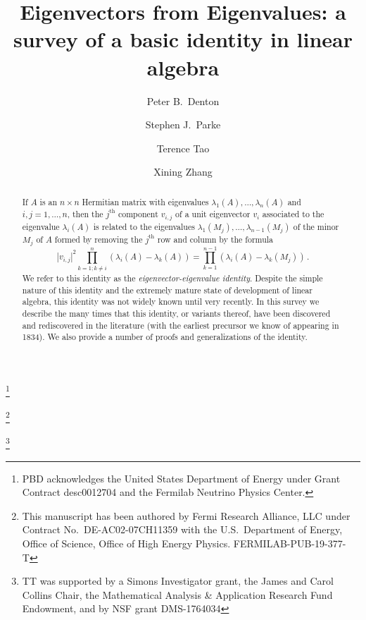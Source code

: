 \documentclass[12pt]{amsart}
\begin{document}
\title[Eigenvectors from eigenvalues]{Eigenvectors from Eigenvalues: a survey of a basic identity in linear algebra}

\author{Peter B.~Denton}
\address{Department of Physics, Brookhaven National Laboratory, Upton, NY 11973, USA}
\thanks{PBD acknowledges the United States Department of Energy under Grant Contract desc0012704 and the Fermilab Neutrino Physics Center.}

\author{Stephen J.~Parke}
\address{Theoretical Physics Department, Fermi National Accelerator Laboratory, Batavia, IL 60510, USA}
\thanks{This manuscript has been authored by Fermi Research Alliance, LLC under Contract No.~DE-AC02-07CH11359 with the U.S.~Department of Energy, Office of Science, Office of High Energy Physics.
FERMILAB-PUB-19-377-T}

\author{Terence Tao}
\address{Department of Mathematics, UCLA, Los Angeles CA 90095-1555}
 \thanks{TT was supported by a Simons Investigator grant, the James and Carol Collins Chair, the Mathematical Analysis \& Application Research Fund Endowment, and by NSF grant DMS-1764034}

\author{Xining Zhang}
\address{Enrico Fermi Institute \& Department of Physics, University of Chicago, Chicago, IL 60637, USA}

\begin{abstract}  If $A$ is an $n \times n$ Hermitian matrix with eigenvalues $\lambda_1(A),\dots,\lambda_n(A)$ and $i,j = 1,\dots,n$, then the $j^{\mathrm{th}}$ component $v_{i,j}$ of a unit eigenvector $v_i$ associated to the eigenvalue $\lambda_i(A)$ is related to the eigenvalues $\lambda_1(M_j),\dots,\lambda_{n-1}(M_j)$ of the minor $M_j$ of $A$ formed by removing the $j^{\mathrm{th}}$ row and column by the formula
$$ |v_{i,j}|^2\prod_{k=1;k\neq i}^{n}\left(\lambda_i(A)-\lambda_k(A)\right)=\prod_{k=1}^{n-1}\left(\lambda_i(A)-\lambda_k(M_j)\right)\,.$$
We refer to this identity as the \emph{eigenvector-eigenvalue identity}.  Despite the simple nature of this identity and the extremely mature state of development of linear algebra, this identity was not widely known until very recently.  In this survey we describe the many times that this identity, or variants thereof, have been discovered and rediscovered in the literature (with the earliest precursor we know of appearing in 1834).  We also provide a number of proofs and generalizations of the identity.  
\end{abstract}
\end{document}
